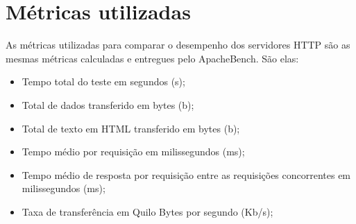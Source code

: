 \section{Métricas utilizadas}
As métricas utilizadas para comparar o desempenho dos servidores HTTP são as 
mesmas métricas calculadas e entregues pelo ApacheBench. São elas:
\begin{itemize}
	\item Tempo total do teste em segundos (s);
	\item Total de dados transferido em bytes (b);
	\item Total de texto em HTML transferido em bytes (b);
	\item Tempo médio por requisição em milissegundos (ms);
	\item Tempo médio de resposta por requisição entre as requisições 
	concorrentes em milissegundos (ms);
	\item Taxa de transferência em Quilo Bytes por segundo (Kb/s);
\end{itemize}
